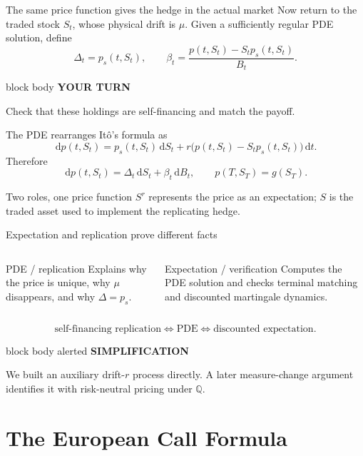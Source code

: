 \documentclass[handout,10pt,aspectratio=169]{beamer}
\newenvironment{simplificationbox}{%
  \begin{beamercolorbox}[rounded=true,sep=0.7em,wd=\textwidth]{block body alerted}
  \textbf{\color{CourseRed}SIMPLIFICATION}\quad
}{\end{beamercolorbox}}
\newenvironment{pausebox}{%
  \begin{beamercolorbox}[rounded=true,sep=0.8em,wd=\textwidth]{block body}
  \textbf{\color{CourseGold}YOUR TURN}\quad
}{\end{beamercolorbox}}
\newcommand{\dd}{\,\mathrm d}
\newcommand{\Q}{\mathbb Q}
\newcommand{\1}{\mathbf 1}
\begin{document}
\begin{frame}{The same price function gives the hedge in the actual market}
\small
Now return to the traded stock \(S_t\), whose physical drift is \(\mu\).
Given a sufficiently regular PDE solution, define
\[
\Delta_t=p_s(t,S_t),
\qquad
\beta_t=\frac{p(t,S_t)-S_tp_s(t,S_t)}{B_t}.
\]
\begin{pausebox}
Check that these holdings are self-financing and match the payoff.
\end{pausebox}

The PDE rearranges It\^o's formula as
\[
\dd p(t,S_t)
=p_s(t,S_t)\dd S_t
+r\bigl(p(t,S_t)-S_tp_s(t,S_t)\bigr)\dd t.
\]
Therefore
\[
\dd p(t,S_t)=\Delta_t\dd S_t+\beta_t\dd B_t,
\qquad
p(T,S_T)=g(S_T).
\]
\begin{block}{Two roles, one price function}
\(S^r\) represents the price as an expectation; \(S\) is the traded asset
used to implement the replicating hedge.
\end{block}
\end{frame}

\begin{frame}{Expectation and replication prove different facts}
\begin{columns}[T,onlytextwidth]
\begin{block}{PDE / replication}
Explains why the price is unique, why \(\mu\) disappears, and why
\(\Delta=p_s\).
\end{block}
\begin{exampleblock}{Expectation / verification}
Computes the PDE solution and checks terminal matching and discounted
martingale dynamics.
\end{exampleblock}
\end{columns}
\medskip
\[
\boxed{
\text{self-financing replication}
\Longleftrightarrow
\text{PDE}
\Longleftrightarrow
\text{discounted expectation}.}
\]
\begin{simplificationbox}
We built an auxiliary drift-\(r\) process directly. A later measure-change
argument identifies it with risk-neutral pricing under \(\Q\).
\end{simplificationbox}
\end{frame}

\section{The European Call Formula}
\end{document}
